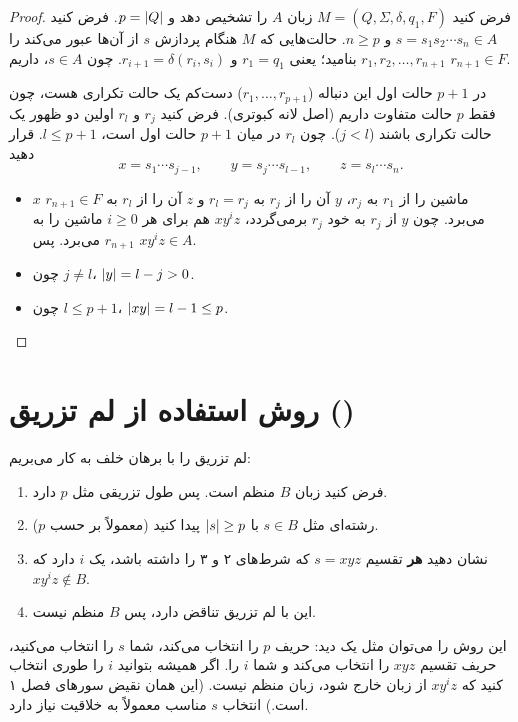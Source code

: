 \begin{proof}
فرض کنید  $M=(Q,\Sigma,\delta,q_1,F)$ زبان $A$ را تشخیص دهد و $p=\lvert Q\rvert$. فرض کنید $s=s_1s_2\cdots s_n\in A$ و $n\ge p$. حالت‌هایی که $M$ هنگام پردازش $s$ از آن‌ها عبور می‌کند را $r_1,r_2,\dots,r_{n+1}$ بنامید؛ یعنی $r_1=q_1$ و $r_{i+1}=\delta(r_i,s_i)$. چون $s\in A$، داریم $r_{n+1}\in F$.

در $p+1$ حالت اول این دنباله ($r_1,\dots,r_{p+1}$) دست‌کم یک حالت تکراری هست، چون فقط $p$ حالت متفاوت داریم (اصل لانه کبوتری). فرض کنید $r_j$ و $r_l$ اولین دو ظهور یک حالت تکراری باشند ($j<l$). چون $r_l$ در میان $p+1$ حالت اول است، $l\le p+1$. قرار دهید
\[x=s_1\cdots s_{j-1},\qquad y=s_j\cdots s_{l-1},\qquad z=s_l\cdots s_n.\]
\begin{itemize}
\item $x$ ماشین را از $r_1$ به $r_j$، $y$ آن را از $r_j$ به $r_l=r_j$ و $z$ آن را از $r_l$ به $r_{n+1}\in F$ می‌برد. چون $y$ از $r_j$ به خود $r_j$ برمی‌گردد، $xy^iz$ هم برای هر $i\ge0$ ماشین را به $r_{n+1}$ می‌برد. پس $xy^iz\in A$.
\item چون $j\neq l$، $\lvert y\rvert=l-j>0$.
\item چون $l\le p+1$، $\lvert xy\rvert=l-1\le p$.\qedhere
\end{itemize}
\end{proof}

\section{روش استفاده از لم تزریق ()}

لم تزریق را با برهان خلف به کار می‌بریم:
\begin{enumerate}
\item فرض کنید زبان $B$ منظم است. پس طول تزریقی مثل $p$ دارد.
\item رشته‌ای مثل $s\in B$ با $\lvert s\rvert\ge p$ پیدا کنید (معمولاً بر حسب $p$).
\item نشان دهید \textbf{هر} تقسیم $s=xyz$ که شرط‌های ۲ و ۳ را داشته باشد، یک $i$ دارد که $xy^iz\notin B$.
\item این با لم تزریق تناقض دارد، پس $B$ منظم نیست.
\end{enumerate}

این روش را می‌توان مثل یک  دید: حریف $p$ را انتخاب می‌کند، شما $s$ را انتخاب می‌کنید، حریف تقسیم $xyz$ را انتخاب می‌کند و شما $i$ را. اگر همیشه بتوانید $i$ را طوری انتخاب کنید که $xy^iz$ از زبان خارج شود، زبان منظم نیست. (این همان نقیض سورهای فصل ۱ است.) انتخاب $s$ مناسب معمولاً به خلاقیت نیاز دارد.

